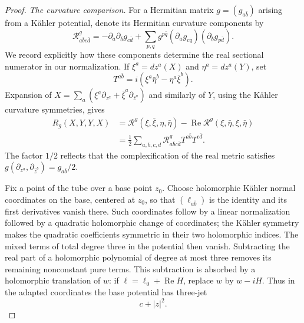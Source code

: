 \begin{proof}
\emph{The curvature comparison.}
For a Hermitian matrix $g=(g_{a\bar b})$ arising from a K\"ahler
potential, denote its Hermitian curvature components by
\begin{equation}\label{tube:hermitian-curvature}
 \mathcal R^g_{a\bar b c\bar d}
 =-\partial_a\partial_{\bar b}g_{c\bar d}
   +\sum_{p,q}g^{p\bar q}
       (\partial_a g_{c\bar q})(\partial_{\bar b}g_{p\bar d}).
\end{equation}
We record explicitly how these components determine the real
sectional numerator in our normalization.  If
$\xi^a=dz^a(X)$ and $\eta^a=dz^a(Y)$, set
\[
 T^{a\bar b}=i(\xi^a\bar\eta^b-\eta^a\bar\xi^b).
\]
Expansion of $X=\sum_a(\xi^a\partial_{z^a}
+\bar\xi^a\partial_{\bar z^a})$ and similarly of $Y$, using the
K\"ahler curvature symmetries, gives
\begin{align}
 R_g(X,Y,Y,X)
 &=\mathcal R^g(\xi,\bar\xi,\eta,\bar\eta)
   -\operatorname{Re}\mathcal R^g(\xi,\bar\eta,\xi,\bar\eta)
       \label{tube:real-complex-curvature}\\
 &=\frac12\sum_{a,b,c,d}
        \mathcal R^g_{a\bar b c\bar d}
        T^{a\bar b}T^{c\bar d}.\nonumber
\end{align}
The factor $1/2$ reflects that the complexification of the real
metric satisfies
$g(\partial_{z^a},\partial_{\bar z^b})=g_{a\bar b}/2$.

Fix a point of the tube over a base point $z_0$.  Choose holomorphic
K\"ahler normal coordinates on the base, centered at $z_0$, so that
$(\ell_{a\bar b})$ is the identity and its first derivatives vanish
there.  Such coordinates follow by a linear normalization followed
by a quadratic holomorphic change of coordinates; the K\"ahler
symmetry makes the quadratic coefficients symmetric in their two
holomorphic indices.  The mixed terms of total degree three in the
potential then vanish.  Subtracting the real part of a holomorphic
polynomial of degree at most three removes its remaining nonconstant
pure terms.  This subtraction is absorbed by a holomorphic
translation of $w$: if $\ell=\ell_0+\operatorname{Re}H$, replace
$w$ by $w-iH$.  Thus in the adapted coordinates the base potential
has three-jet
\[
 c+|z|^2.
\]


\end{proof}
